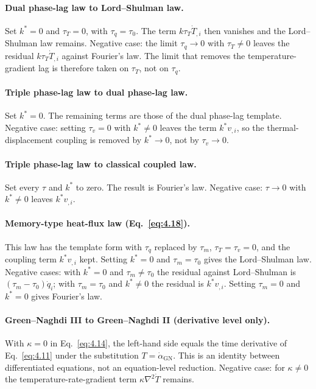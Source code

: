 \paragraph{Dual phase-lag law to Lord--Shulman law.} Set $k^*=0$ and $\tau_T=0$, with $\tau_q=\tau_0$. The term $k\tau_T\dot T_{,i}$ then vanishes and the Lord--Shulman law remains. Negative case: the limit $\tau_q\to0$ with $\tau_T\neq0$ leaves the residual $k\tau_T\dot T_{,i}$ against Fourier's law. The limit that removes the temperature-gradient lag is therefore taken on $\tau_T$, not on $\tau_q$.

\paragraph{Triple phase-lag law to dual phase-lag law.} Set $k^*=0$. The remaining terms are those of the dual phase-lag template. Negative case: setting $\tau_v=0$ with $k^*\neq0$ leaves the term $k^*v_{,i}$, so the thermal-displacement coupling is removed by $k^*\to0$, not by $\tau_v\to0$.

\paragraph{Triple phase-lag law to classical coupled law.} Set every $\tau$ and $k^*$ to zero. The result is Fourier's law. Negative case: $\tau\to0$ with $k^*\neq0$ leaves $k^*v_{,i}$.

\paragraph{Memory-type heat-flux law (Eq.~\eqref{eq:4.18}).} This law has the template form with $\tau_q$ replaced by $\tau_m$, $\tau_T=\tau_v=0$, and the coupling term $k^*v_{,i}$ kept. Setting $k^*=0$ and $\tau_m=\tau_0$ gives the Lord--Shulman law. Negative cases: with $k^*=0$ and $\tau_m\neq\tau_0$ the residual against Lord--Shulman is $(\tau_m-\tau_0)\dot q_i$; with $\tau_m=\tau_0$ and $k^*\neq0$ the residual is $k^*v_{,i}$. Setting $\tau_m=0$ and $k^*=0$ gives Fourier's law.

\paragraph{Green--Naghdi III to Green--Naghdi II (derivative level only).} With $\kappa=0$ in Eq.~\eqref{eq:4.14}, the left-hand side equals the time derivative of Eq.~\eqref{eq:4.11} under the substitution $T=\dot\alpha_{\mathrm{GN}}$. This is an identity between differentiated equations, not an equation-level reduction. Negative case: for $\kappa\neq0$ the temperature-rate-gradient term $\kappa\nabla^2\dot T$ remains.

